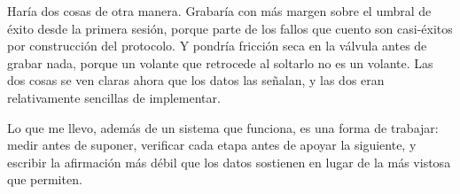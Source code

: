 Haría dos cosas de otra manera. Grabaría con más margen sobre el umbral de éxito desde la primera
sesión, porque parte de los fallos que cuento son casi-éxitos por construcción del protocolo. Y
pondría fricción seca en la válvula antes de grabar nada, porque un volante que retrocede al
soltarlo no es un volante. Las dos cosas se ven claras ahora que los datos las señalan, y las dos
eran relativamente sencillas de implementar.

Lo que me llevo, además de un sistema que funciona, es una forma de trabajar: medir antes de
suponer, verificar cada etapa antes de apoyar la siguiente, y escribir la afirmación más débil
que los datos sostienen en lugar de la más vistosa que permiten. 
